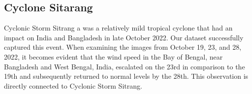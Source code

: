 \documentclass[conference]{IEEEtran}
\begin{document}
\subsection{Cyclone Sitarang}

Cyclonic Storm Sitrang a was a relatively mild tropical cyclone that had an impact on India and Bangladesh in late October 2022. Our dataset successfully captured this event. When examining the images from October 19, 23, and 28, 2022, it becomes evident that the wind speed in the Bay of Bengal, near Bangladesh and West Bengal, India, escalated on the 23rd in comparison to the 19th and subsequently returned to normal levels by the 28th. This observation is directly connected to Cyclonic Storm Sitrang.
\end{document}
